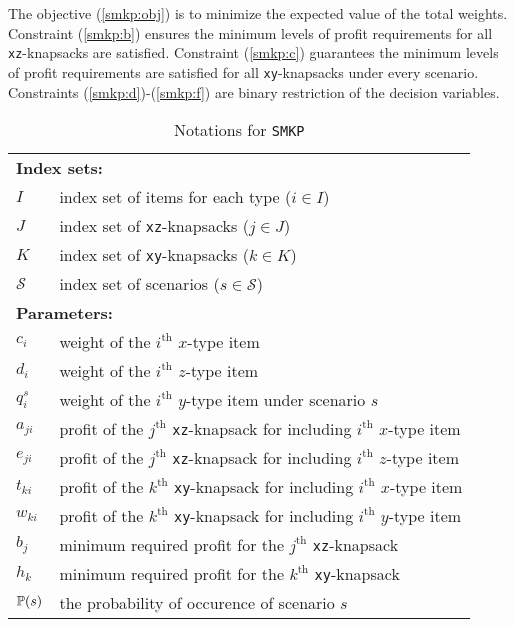 The objective (\ref{smkp:obj}) is to minimize the expected value of the total weights. Constraint (\ref{smkp:b}) ensures the minimum levels of profit requirements for all \texttt{xz}-knapsacks are satisfied. Constraint (\ref{smkp:c}) guarantees the minimum levels of profit requirements are satisfied for all \texttt{xy}-knapsacks under every scenario. Constraints (\ref{smkp:d})-(\ref{smkp:f}) are binary restriction of the decision variables.

\begin{table}[H]
	\caption{Notations for \texttt{SMKP}}
	\label{smkp:notation}
	\resizebox{\textwidth}{!}
	{
		\begin{tabular}{ll}
			\toprule
			\multicolumn{2}{l}{\textbf{Index sets:}} \\
			$I$ &  index set of items for each type ($i\in I$)\\ 
			$J$ &  index set of \texttt{xz}-knapsacks ($j \in J$)\\ 
			$K$ &  index set of \texttt{xy}-knapsacks ($k \in K$)\\
			$\mathcal{S}$ & index set of scenarios ($s\in \mathcal{S}$)\\ \midrule
			\multicolumn{2}{l}{\textbf{Parameters:}} \\
			$c_{i}$ 	& weight of the $i^{\mathrm{th}}$ $x$-type item 		\\ 
			$d_{i}$ 	& weight of the $i^{\mathrm{th}}$ $z$-type item  		\\ 
			$q_{i}^{s}$ & weight of the $i^{\mathrm{th}}$ $y$-type item under scenario $s$ 		\\ 
			$a_{ji}$	& profit of the $j^{\mathrm{th}}$ \texttt{xz}-knapsack for including $i^{\mathrm{th}}$ $x$-type item		\\
			$e_{ji}$	& profit of the $j^{\mathrm{th}}$ \texttt{xz}-knapsack for including $i^{\mathrm{th}}$ $z$-type item		\\
			$t_{ki}$	& profit of the $k^{\mathrm{th}}$ \texttt{xy}-knapsack for including $i^{\mathrm{th}}$ $x$-type item	\\
			$w_{ki}$	& profit of the $k^{\mathrm{th}}$ \texttt{xy}-knapsack for including $i^{\mathrm{th}}$ $y$-type item		\\
			$b_j$		& minimum required profit for the $j^{\mathrm{th}}$ \texttt{xz}-knapsack		\\
			$h_k$		& minimum required profit for the $k^{\mathrm{th}}$ \texttt{xy}-knapsack		\\
			$\operatorname*{\mathbb{P}}(s)$ 	& \textrm{the probability of occurence of scenario $s$} \\ \midrule

\end{tabular}}
\end{table}
